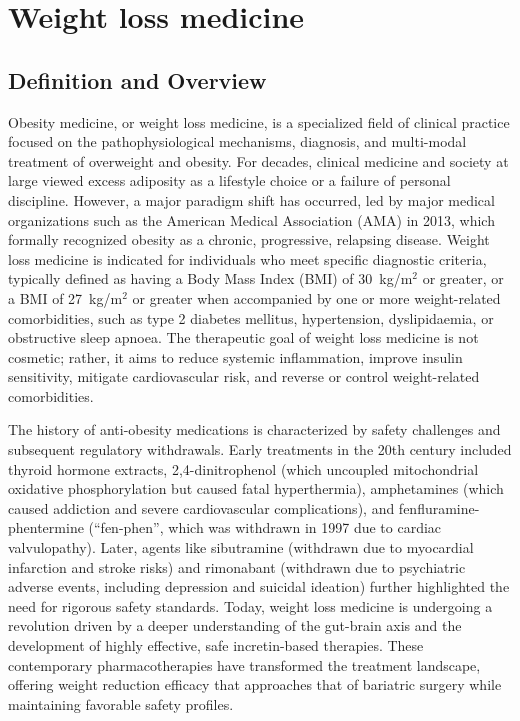 \chapter{Weight loss medicine}

\section*{Definition and Overview}
Obesity medicine, or weight loss medicine, is a specialized field of clinical practice focused on the pathophysiological mechanisms, diagnosis, and multi-modal treatment of overweight and obesity. For decades, clinical medicine and society at large viewed excess adiposity as a lifestyle choice or a failure of personal discipline. However, a major paradigm shift has occurred, led by major medical organizations such as the American Medical Association (AMA) in 2013, which formally recognized obesity as a chronic, progressive, relapsing disease. Weight loss medicine is indicated for individuals who meet specific diagnostic criteria, typically defined as having a Body Mass Index (BMI) of 30~kg/m$^2$ or greater, or a BMI of 27~kg/m$^2$ or greater when accompanied by one or more weight-related comorbidities, such as type 2 diabetes mellitus, hypertension, dyslipidaemia, or obstructive sleep apnoea. The therapeutic goal of weight loss medicine is not cosmetic; rather, it aims to reduce systemic inflammation, improve insulin sensitivity, mitigate cardiovascular risk, and reverse or control weight-related comorbidities.

The history of anti-obesity medications is characterized by safety challenges and subsequent regulatory withdrawals. Early treatments in the 20th century included thyroid hormone extracts, 2,4-dinitrophenol (which uncoupled mitochondrial oxidative phosphorylation but caused fatal hyperthermia), amphetamines (which caused addiction and severe cardiovascular complications), and fenfluramine-phentermine (``fen-phen'', which was withdrawn in 1997 due to cardiac valvulopathy). Later, agents like sibutramine (withdrawn due to myocardial infarction and stroke risks) and rimonabant (withdrawn due to psychiatric adverse events, including depression and suicidal ideation) further highlighted the need for rigorous safety standards. Today, weight loss medicine is undergoing a revolution driven by a deeper understanding of the gut-brain axis and the development of highly effective, safe incretin-based therapies. These contemporary pharmacotherapies have transformed the treatment landscape, offering weight reduction efficacy that approaches that of bariatric surgery while maintaining favorable safety profiles.


